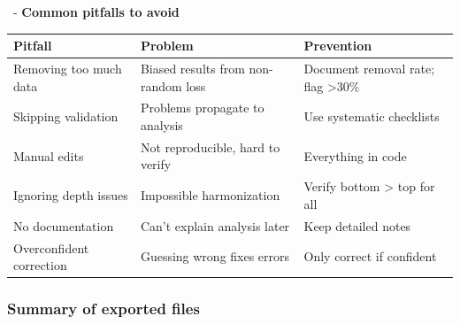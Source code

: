 \documentclass[
  10pt,
  b5paper,
  oneside]{book}
\begin{document}
\hfill\break

~- \textbf{Common pitfalls to avoid}

\begin{longtable}[]{@{}
  >{\raggedright\arraybackslash}p{}
  >{\raggedright\arraybackslash}p{}
  >{\raggedright\arraybackslash}p{}@{}}
\toprule\noalign{}
\begin{minipage}[b]{\linewidth}\raggedright
Pitfall
\end{minipage} & \begin{minipage}[b]{\linewidth}\raggedright
Problem
\end{minipage} & \begin{minipage}[b]{\linewidth}\raggedright
Prevention
\end{minipage} \\
\midrule\noalign{}
\endhead
\bottomrule\noalign{}
\endlastfoot
Removing too much data & Biased results from non-random loss & Document removal rate; flag \textgreater30\% \\
Skipping validation & Problems propagate to analysis & Use systematic checklists \\
Manual edits & Not reproducible, hard to verify & Everything in code \\
Ignoring depth issues & Impossible harmonization & Verify bottom \textgreater{} top for all \\
No documentation & Can't explain analysis later & Keep detailed notes \\
Overconfident correction & Guessing wrong fixes errors & Only correct if confident \\
\end{longtable}

\subsubsection{Summary of exported files}\label{summary-of-exported-files}
\end{document}
